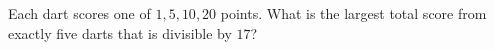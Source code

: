 Each dart scores one of $1,5,10,20$ points. What is the largest total score from exactly five darts that is divisible by $17$?
